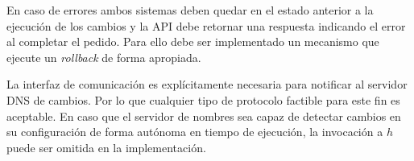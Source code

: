 En caso de errores ambos sistemas deben quedar en el estado anterior a la ejecución de los cambios y la API debe retornar una respuesta indicando el error al completar el pedido. Para ello debe ser implementado un mecanismo que ejecute un \textit{rollback} de forma apropiada.

La interfaz de comunicación es explícitamente necesaria para notificar al servidor DNS de cambios. Por lo que cualquier tipo de protocolo factible para este fin es aceptable. En caso que el servidor de nombres sea capaz de detectar cambios en su configuración de forma autónoma en tiempo de ejecución, la invocación a $h$ puede ser omitida en la implementación.
